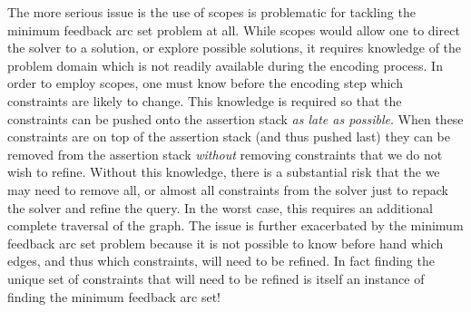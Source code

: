 The more serious issue is the use of scopes is problematic for tackling the
minimum feedback arc set problem at all. While scopes would allow one to direct
the solver to a solution, or explore possible solutions, it requires knowledge
of the problem domain which is not readily available during the encoding
process. In order to employ scopes, one must know before the encoding step which
constraints are likely to change. This knowledge is required so that the
constraints can be pushed onto the assertion stack \emph{as late as possible}.
When these constraints are on top of the assertion stack (and thus pushed last)
they can be removed from the assertion stack \emph{without} removing constraints
that we do not wish to refine. Without this knowledge, there is a substantial
risk that the we may need to remove all, or almost all constraints from the
solver just to repack the solver and refine the query. In the worst case, this
requires an additional complete traversal of the graph. The issue is further
exacerbated by the minimum feedback arc set problem because it is not possible
to know before hand which edges, and thus which constraints, will need to be
refined. In fact finding the unique set of constraints that will need to be
refined is itself an instance of finding the minimum feedback arc set!


